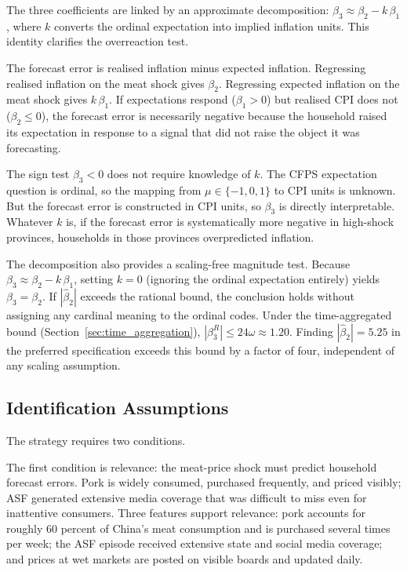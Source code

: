 The three coefficients are linked by an approximate
decomposition:
$\beta_3 \approx \beta_2 - k\,\beta_1$, where $k$ converts
the ordinal expectation into implied inflation units.
This identity clarifies the overreaction test.

The forecast error is realised inflation minus expected inflation.
Regressing realised inflation on the meat shock gives $\beta_2$.
Regressing expected inflation on the meat shock gives
$k\,\beta_1$.
If expectations respond ($\beta_1 > 0$) but realised CPI does
not ($\beta_2 \leq 0$), the forecast error is necessarily
negative because the household raised its expectation in response
to a signal that did not raise the object it was forecasting.

The sign test $\beta_3 < 0$ does not require knowledge of $k$.
The CFPS expectation question is ordinal, so the mapping from
$\mu \in \{-1,0,1\}$ to CPI units is unknown.
But the forecast error is constructed in CPI units, so
$\beta_3$ is directly interpretable.
Whatever $k$ is, if the forecast error is systematically more
negative in high-shock provinces, households in those provinces
overpredicted inflation.

The decomposition also provides a scaling-free magnitude test.
Because $\beta_3 \approx \beta_2 - k\,\beta_1$, setting
$k = 0$ (ignoring the ordinal expectation entirely) yields
$\beta_3 = \beta_2$.
If $|\hat{\beta}_2|$ exceeds the rational bound, the
conclusion holds without assigning any cardinal meaning to
the ordinal codes.
Under the time-aggregated bound
(Section~\ref{sec:time_aggregation}),
$|\beta_3^R| \leq 24\omega \approx 1.20$.
Finding $|\hat{\beta}_2| = 5.25$ in the preferred
specification exceeds this bound by a factor of four,
independent of any scaling assumption.

\subsection{Identification Assumptions}%
\label{sec:identification_assumptions}

The strategy requires two conditions.

The first condition is relevance: the meat-price shock must
predict household forecast errors.
Pork is widely consumed, purchased frequently, and priced
visibly; ASF generated extensive media coverage that was
difficult to miss even for inattentive consumers.
Three features support relevance: pork accounts for roughly
60 percent of China's meat consumption and is purchased several
times per week; the ASF episode received extensive state and
social media coverage; and prices at wet markets are posted on
visible boards and updated daily.

